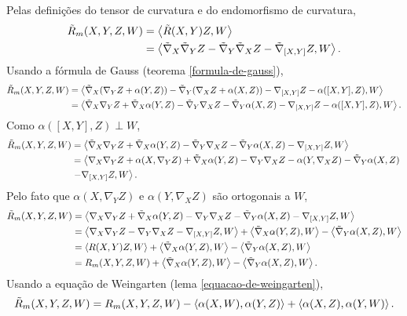 \begin{demonstracao}
	Pelas definições do tensor de curvatura e do endomorfismo de curvatura,
	\begin{align*}
		\tilde{R}_m(X,Y,Z,W) &= \left\langle \tilde{R}(X,Y)Z,W \right\rangle\\
		&= \left\langle \tilde{\nabla}_X \tilde{\nabla}_Y Z - \tilde{\nabla}_Y \tilde{\nabla}_X Z - \tilde{\nabla}_{[X,Y]} Z,W \right\rangle.
	\end{align*}
	Usando a fórmula de Gauss (teorema \ref{formula-de-gauss}),
	\begin{align*}
		\tilde{R}_m(X,Y,Z,W) &= \left\langle \tilde{\nabla}_X (\nabla_Y Z + \alpha(Y,Z)) - \tilde{\nabla}_Y (\nabla_X Z + \alpha(X,Z)) - \nabla_{[X,Y]} Z - \alpha([X,Y],Z),W \right\rangle\\
		&= \left\langle \tilde{\nabla}_X \nabla_Y Z + \tilde{\nabla}_X \alpha(Y,Z) - \tilde{\nabla}_Y \nabla_X Z - \tilde{\nabla}_Y \alpha(X,Z) - \nabla_{[X,Y]} Z - \alpha([X,Y],Z),W \right\rangle.
	\end{align*}
	Como $\alpha([X,Y],Z) \perp W$,
	\begin{align*}
		\tilde{R}_m(X,Y,Z,W) &= \left\langle \tilde{\nabla}_X \nabla_Y Z + \tilde{\nabla}_X \alpha(Y,Z) - \tilde{\nabla}_Y \nabla_X Z - \tilde{\nabla}_Y \alpha(X,Z) - \nabla_{[X,Y]} Z,W \right\rangle\\
		&= \left\langle \nabla_X \nabla_Y Z + \alpha(X, \nabla_Y Z) + \tilde{\nabla}_X \alpha(Y,Z) - \nabla_Y \nabla_X Z - \alpha(Y, \nabla_X Z) - \tilde{\nabla}_Y \alpha(X,Z)\right.\\
		& \left. - \nabla_{[X,Y]} Z, W \right\rangle.
	\end{align*}
	Pelo fato que $\alpha(X, \nabla_Y Z)$ e $\alpha(Y, \nabla_X Z)$ são ortogonais a $W$,
	\begin{align*}
		\tilde{R}_m(X,Y,Z,W) &= \left\langle \nabla_X \nabla_Y Z + \tilde{\nabla}_X \alpha(Y,Z) - \nabla_Y \nabla_X Z - \tilde{\nabla}_Y \alpha(X,Z) - \nabla_{[X,Y]} Z,W \right\rangle\\
		&=  \left\langle \nabla_X \nabla_Y Z - \nabla_Y \nabla_X Z - \nabla_{[X,Y]} Z,W \right\rangle +  \left\langle \tilde{\nabla}_X \alpha(Y,Z),W \right\rangle -  \left\langle \tilde{\nabla}_Y \alpha(X,Z),W \right\rangle\\
		&=  \left\langle R(X,Y)Z,W \right\rangle +  \left\langle \tilde{\nabla}_X \alpha(Y,Z),W \right\rangle -  \left\langle \tilde{\nabla}_Y \alpha(X,Z),W \right\rangle\\
		&= R_m(X,Y,Z,W) +  \left\langle \tilde{\nabla}_X \alpha(Y,Z),W \right\rangle -  \left\langle \tilde{\nabla}_Y \alpha(X,Z),W \right\rangle.
	\end{align*}
	Usando a equação de Weingarten (lema \ref{equacao-de-weingarten}),
	\begin{equation*}
		\tilde{R}_m(X,Y,Z,W) = R_m(X,Y,Z,W) - \left\langle \alpha(X,W),\alpha(Y,Z) \right\rangle + \left\langle \alpha(X,Z),\alpha(Y,W) \right\rangle.
	\end{equation*}
\end{demonstracao}

